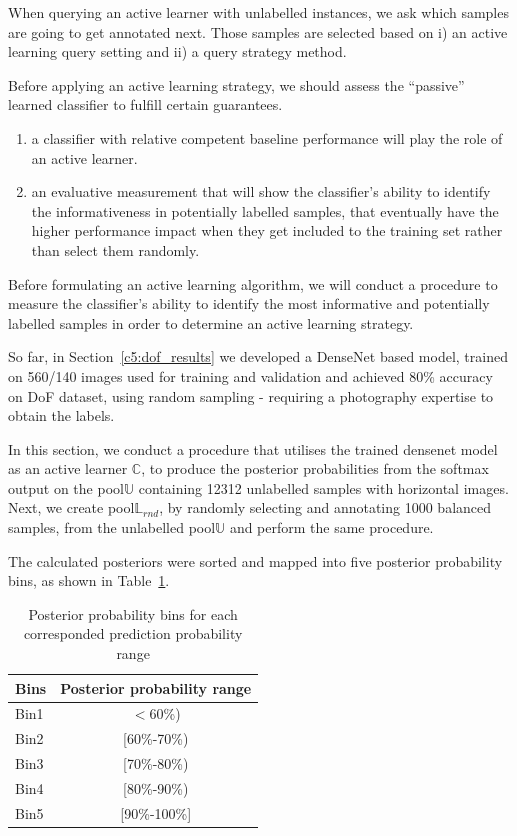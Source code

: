 When querying an active learner with unlabelled instances, we ask which samples are going to get annotated next. Those samples are selected based on i) an active learning query setting %
and ii) a query strategy method. %

Before applying an active learning strategy, we should assess the ``passive'' learned classifier to fulfill certain guarantees. 
\begin{enumerate}
 \item a classifier with relative competent baseline performance will play the role of an active learner.
 \item an evaluative measurement that will show the classifier's ability to identify the informativeness in potentially labelled samples, that eventually have the higher performance impact when they get included to the training set rather than select them randomly.
\end{enumerate}


Before formulating an active learning algorithm, we will conduct a procedure to measure the classifier's ability to identify the most informative and potentially labelled samples in order to determine an active learning strategy.

So far, in Section~\ref{c5:dof_results} we developed a DenseNet based model, trained on 560/140 images used for training and validation and achieved 80\% accuracy on DoF dataset, using random sampling - requiring a photography expertise to obtain the labels.

In this section, we conduct a procedure that utilises the trained densenet model as an active learner $\mathbb{C}$, to produce the posterior probabilities from the softmax output on the pool$\mathbb{U}$ containing 12312 unlabelled samples with horizontal images. Next, we create pool$\mathbb{L}_{rnd}$, by randomly selecting and annotating 1000 balanced samples, from the unlabelled pool$\mathbb{U}$ and perform the same procedure.


The calculated posteriors were sorted and mapped into five posterior probability bins, as shown in Table~\ref{c5:probability_bins}.
\begin{table}[ht!]
    \centering
    \footnotesize
    \begin{tabular}{|l|c|}
    \hline
    \textbf{Bins} & Posterior probability range \\ \hline
    Bin1 & $<$60\%) \\ \hline
    Bin2 & [60\%-70\%) \\ \hline
    Bin3 & [70\%-80\%) \\ \hline
    Bin4 & [80\%-90\%) \\ \hline
    Bin5 & [90\%-100\%]  \\ \hline
    \end{tabular}
    \caption{Posterior probability bins for each corresponded prediction probability range}
    \label{c5:probability_bins}
\end{table}

